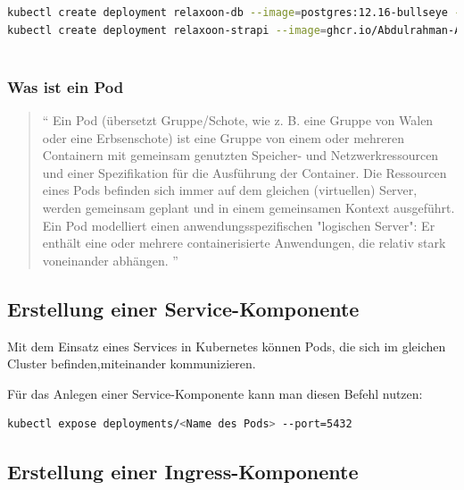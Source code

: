 \begin{lstlisting}[language=bash, caption=create k8s deployments]
kubectl create deployment relaxoon-db --image=postgres:12.16-bullseye --port=5432
kubectl create deployment relaxoon-strapi --image=ghcr.io/Abdulrahman-AL-Sabagh/relaxoon-strapi:latest --port=8080
    
\end{lstlisting}


\subsubsection{Was ist ein Pod}

\begin{quotation}
  ``
  Ein Pod (übersetzt Gruppe/Schote, wie z. B. eine Gruppe von Walen oder eine Erbsenschote)
  ist eine Gruppe von einem oder mehreren Containern mit gemeinsam genutzten Speicher- und
  Netzwerkressourcen und einer Spezifikation für die Ausführung der Container.
  Die Ressourcen eines Pods befinden sich immer auf dem gleichen (virtuellen) Server,
  werden gemeinsam geplant und in einem gemeinsamen Kontext ausgeführt.
  Ein Pod modelliert einen anwendungsspezifischen "logischen Server": Er enthält eine oder mehrere
  containerisierte Anwendungen, die relativ stark voneinander abhängen.
  ''
  \cite{pod}
\end{quotation}






\subsection{Erstellung einer Service-Komponente}

Mit dem Einsatz eines Services in Kubernetes können Pods,
die sich im gleichen Cluster befinden,miteinander kommunizieren. \cite{k8s-service}

Für das Anlegen einer Service-Komponente kann man diesen Befehl nutzen:

\begin{lstlisting}[language=bash,caption=create a service component]
kubectl expose deployments/<Name des Pods> --port=5432
\end{lstlisting}






\subsection{Erstellung einer Ingress-Komponente}

